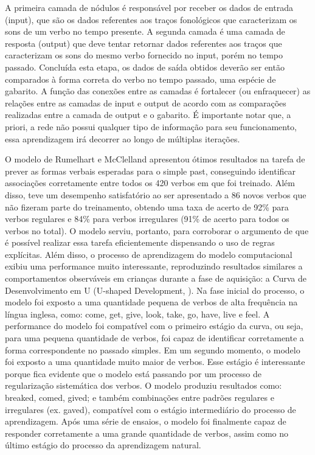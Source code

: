 A primeira camada de nódulos é responsável por receber os dados de entrada (input), que são os dados referentes aos traços fonológicos que caracterizam os sons de um verbo no tempo presente. A segunda camada é uma camada de resposta (output) que deve tentar retornar dados referentes aos traços que caracterizam os sons do mesmo verbo fornecido no input, porém no tempo passado. Concluída esta etapa, os dados de saída obtidos deverão ser então comparados à forma correta do verbo no tempo passado, uma espécie de gabarito. A função das conexões entre as camadas é fortalecer (ou enfraquecer) as relações entre as camadas de input e output de acordo com as comparações realizadas entre a camada de output e o gabarito. É importante notar que, a priori, a rede não possui qualquer tipo de informação para seu funcionamento, essa aprendizagem irá decorrer ao longo de múltiplas iterações.

O modelo de Rumelhart e McClelland apresentou ótimos resultados na tarefa de prever as formas verbais esperadas para o simple past, conseguindo identificar associações corretamente entre todos os 420 verbos em que foi treinado. Além disso, teve um desempenho satisfatório ao ser apresentado a 86 novos verbos que não fizeram parte do treinamento, obtendo uma taxa de acerto de 92\% para verbos regulares e 84\% para verbos irregulares (91\% de acerto para todos os verbos no total). O modelo serviu, portanto, para corroborar o argumento de que é possível realizar essa tarefa eficientemente dispensando o uso de regras explícitas. Além disso, o processo de aprendizagem do modelo computacional exibiu uma performance muito interessante, reproduzindo resultados similares a comportamentos observáveis em crianças durante a fase de aquisição: a Curva de Desenvolvimento em U (U-shaped Development, \cite{marcus:1992}). Na fase inicial do processo, o modelo foi exposto a uma quantidade pequena de verbos de alta frequência na língua inglesa, como: come, get, give, look, take, go, have, live e feel. A performance do modelo foi compatível com o primeiro estágio da curva, ou seja, para uma pequena quantidade de verbos, foi capaz de identificar corretamente a forma correspondente no passado simples. Em um segundo momento, o modelo foi exposto a uma quantidade muito maior de verbos. Esse estágio é interessante porque fica evidente que o modelo está passando por um processo de regularização sistemática dos verbos. O modelo produziu resultados como: breaked, comed, gived; e também combinações entre padrões regulares e irregulares (ex. gaved),  compatível com o estágio intermediário do processo de aprendizagem. Após uma série de ensaios, o modelo foi finalmente capaz de responder corretamente a uma grande quantidade de verbos, assim como no último estágio do processo da aprendizagem natural. 

